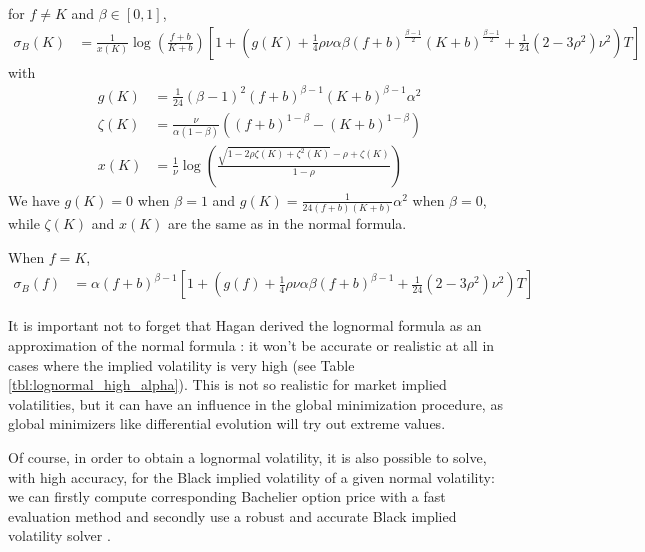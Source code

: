 \documentclass[]{rAMF2e}
\begin{document}
for $f \neq K$ and $\beta \in [0,1]$,
\begin{align}
\sigma_B(K) &= \frac{1}{x(K)}\log\left(\frac{f+b}{K+b}\right)\left[1+\left(g(K)+\frac{1}{4}\rho\nu\alpha\beta(f+b)^{\frac{\beta-1}{2}}(K+b)^{\frac{\beta-1}{2}}+\frac{1}{24}(2-3\rho^2)\nu^2\right)T\right]
\end{align}
with 
\begin{align*}
g(K) &= \frac{1}{24} (\beta-1)^2 (f+b)^{\beta-1} (K+b)^{\beta-1} \alpha^2\\
\zeta(K) &= \frac{\nu}{\alpha (1-\beta)} \left( (f+b)^{1-\beta} - (K+b)^{1-\beta} \right)\\
x(K) &= \frac{1}{\nu}\log\left(\frac{\sqrt{1-2\rho\zeta(K)+\zeta^2(K)}-\rho+\zeta(K)}{1-\rho} \right)
\end{align*}
We have $g(K) = 0$ when $\beta = 1$ and $g(K) = \frac{1}{24(f+b)(K+b)}\alpha^2$ when $\beta = 0$, while $\zeta(K)$ and $x(K)$ are the same as in the normal formula.

When $f=K$, 
\begin{align}
\sigma_B(f) &= \alpha (f+b)^{\beta-1} \left[1+\left(g(f)+\frac{1}{4}\rho\nu\alpha\beta(f+b)^{\beta-1}+\frac{1}{24}(2-3\rho^2)\nu^2\right)T\right]
\end{align}


%
It is important not to forget that Hagan derived the lognormal formula as an approximation of the normal formula \citep{hagan2002managing}: it won't be accurate or realistic at all in cases where the implied volatility is very high (see Table \ref{tbl:lognormal_high_alpha}). This is not so realistic for market implied volatilities, but it can have an influence in the global minimization procedure, as global minimizers like differential evolution will try out extreme values.

Of course, in order to obtain a lognormal volatility, it is also possible to solve, with high accuracy, for the Black implied volatility of a given normal volatility: we can firstly compute corresponding Bachelier option price with a fast evaluation method \citep{lefloch2014bpvol} and secondly use a robust and accurate Black implied volatility solver \citep{jackel2013let, li2011adaptive}.
\end{document}
